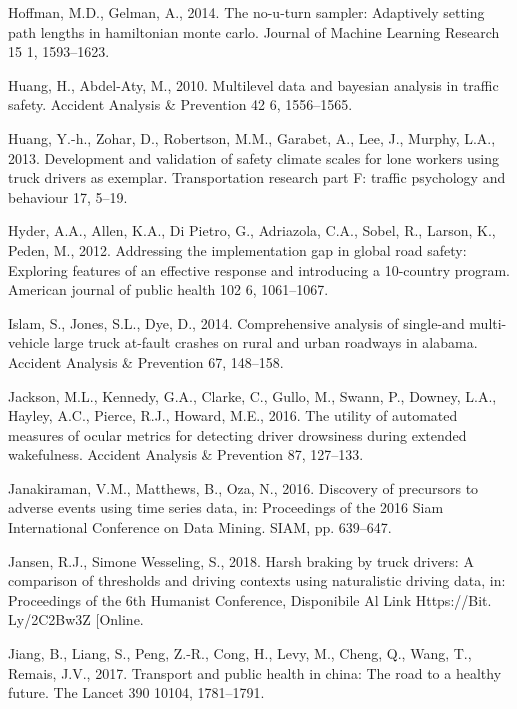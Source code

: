 \documentclass[12pt]{book}
\numberwithin{equation}{chapter}
\begin{document}
\leavevmode\hypertarget{ref-hoffman2014no}{}%
Hoffman, M.D., Gelman, A., 2014. The no-u-turn sampler: Adaptively setting path lengths in hamiltonian monte carlo. Journal of Machine Learning Research 15 1, 1593--1623.

\leavevmode\hypertarget{ref-huang2010multilevel}{}%
Huang, H., Abdel-Aty, M., 2010. Multilevel data and bayesian analysis in traffic safety. Accident Analysis \& Prevention 42 6, 1556--1565.

\leavevmode\hypertarget{ref-huang2013development}{}%
Huang, Y.-h., Zohar, D., Robertson, M.M., Garabet, A., Lee, J., Murphy, L.A., 2013. Development and validation of safety climate scales for lone workers using truck drivers as exemplar. Transportation research part F: traffic psychology and behaviour 17, 5--19.

\leavevmode\hypertarget{ref-hyder2012addressing}{}%
Hyder, A.A., Allen, K.A., Di Pietro, G., Adriazola, C.A., Sobel, R., Larson, K., Peden, M., 2012. Addressing the implementation gap in global road safety: Exploring features of an effective response and introducing a 10-country program. American journal of public health 102 6, 1061--1067.

\leavevmode\hypertarget{ref-islam2014comprehensive}{}%
Islam, S., Jones, S.L., Dye, D., 2014. Comprehensive analysis of single-and multi-vehicle large truck at-fault crashes on rural and urban roadways in alabama. Accident Analysis \& Prevention 67, 148--158.

\leavevmode\hypertarget{ref-jackson2016utility}{}%
Jackson, M.L., Kennedy, G.A., Clarke, C., Gullo, M., Swann, P., Downey, L.A., Hayley, A.C., Pierce, R.J., Howard, M.E., 2016. The utility of automated measures of ocular metrics for detecting driver drowsiness during extended wakefulness. Accident Analysis \& Prevention 87, 127--133.

\leavevmode\hypertarget{ref-janakiraman2016discovery}{}%
Janakiraman, V.M., Matthews, B., Oza, N., 2016. Discovery of precursors to adverse events using time series data, in: Proceedings of the 2016 Siam International Conference on Data Mining. SIAM, pp. 639--647.

\leavevmode\hypertarget{ref-jansen2018harsh}{}%
Jansen, R.J., Simone Wesseling, S., 2018. Harsh braking by truck drivers: A comparison of thresholds and driving contexts using naturalistic driving data, in: Proceedings of the 6th Humanist Conference, Disponibile Al Link Https://Bit. Ly/2C2Bw3Z {[}Online.

\leavevmode\hypertarget{ref-jiang2017transport}{}%
Jiang, B., Liang, S., Peng, Z.-R., Cong, H., Levy, M., Cheng, Q., Wang, T., Remais, J.V., 2017. Transport and public health in china: The road to a healthy future. The Lancet 390 10104, 1781--1791.
\end{document}
